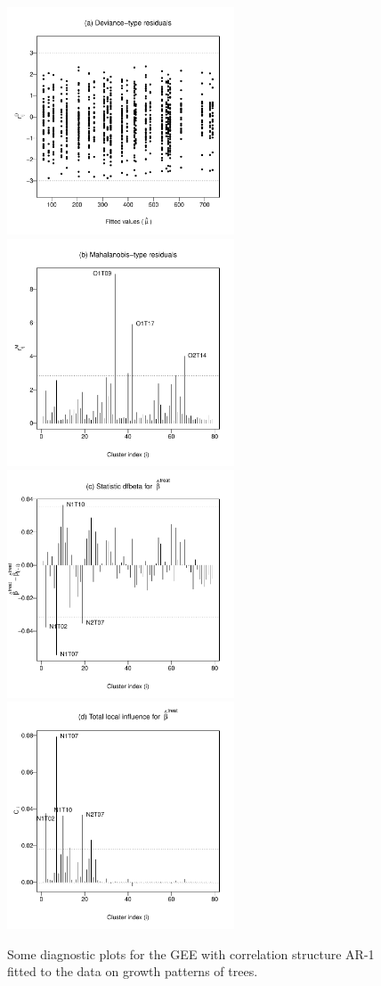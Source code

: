 \begin{figure}[h!]
\centering
\includegraphics[width=6.75cm]{spruces3a}
\includegraphics[width=6.75cm]{spruces3b}\\
\includegraphics[width=6.75cm]{spruces3c}
\includegraphics[width=6.75cm]{spruces3d}
\caption{Some diagnostic plots for the GEE with correlation structure AR-1 fitted to the data on growth
patterns of trees.}
\label{spruces}
\end{figure}

